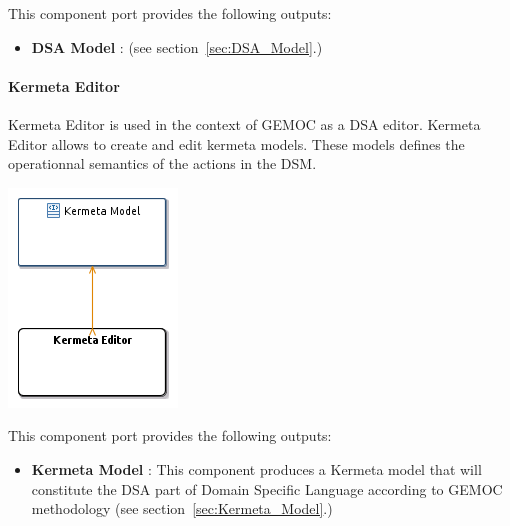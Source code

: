 \documentclass{gemoc} %
\begin{document}
This component port provides the following outputs:
\begin{itemize}
  \item \textbf{DSA Model} :
(see section~\ref{sec:DSA_Model}.)
\end{itemize}

\paragraph{Kermeta Editor}
\label{sec:Kermeta_Editor}
Kermeta Editor is used in the context of GEMOC as a DSA editor.
Kermeta Editor allows to create and edit kermeta models. These models defines the operationnal semantics of the actions in the DSM.
\begin{center}
\includegraphics*[trim=0.0cm 0.0cm 0cm 0.0cm, clip=true]{../images/generated/Generated_Kermeta_Editor.png}
\end{center}


This component port provides the following outputs:
\begin{itemize}
  \item \textbf{Kermeta Model} :
This component produces a Kermeta model that will constitute the DSA part of Domain Specific Language according to GEMOC methodology 
(see section~\ref{sec:Kermeta_Model}.)
\end{itemize}
\end{document}
